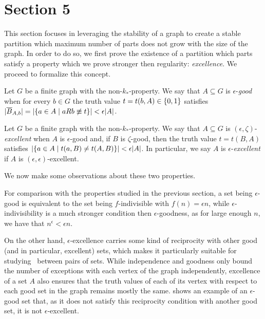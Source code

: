 \section{Section 5} \label{sec:section_5}

    This section focuses in leveraging the stability of a graph to create a stable partition which maximum number
    of parts does not grow with the size of the graph.
    In order to do so, we first prove the existence of a partition which parts satisfy a property which we prove stronger
    then regularity: \emph{excellence}.
    We proceed to formalize this concept.

    \begin{definition}[Definition 5.2(a)]
        Let $G$ be a finite graph with the non-$k_*$-property.
        We say that $A \subseteq G$ is $\epsilon$-\emph{good} when for every $b \in G$ the truth value
        $t = t(b, A) \in \{ 0, 1 \}$ satisfies
        $| \overline{B}_{A,b} | = | \{ a\in A \mid aRb \not\equiv t \} | < \epsilon |A|$.
    \end{definition}

    \begin{definition}[Definition 5.2(b)]
        Let $G$ be a finite graph with the non-$k_*$-property.
        We say that $A \subseteq G$ is $(\epsilon, \zeta)$-\emph{excellent} when $A$ is $\epsilon$-good and, if $B$ is
        $\zeta$-good, then the truth value $t = t(B,A)$ satisfies $| \{ a \in A \mid t(a,B) \neq t(A,B) \} | < \epsilon |A|$.
        In particular, we say $A$ is $\epsilon$-\emph{excellent} if $A$ is $(\epsilon, \epsilon)$-excellent.
    \end{definition}

    We now make some observations about these two properties.

    \begin{remark}
        For comparison with the properties studied in the previous section, a set being $\epsilon$-good is equivalent to the
        set being $f$-indivisible with $f(n) = \epsilon n$, while $\epsilon$-indivisibility is a much stronger condition then
        $\epsilon$-goodness, as for large enough $n$, we have that $n^\epsilon < \epsilon n$.

        On the other hand, $\epsilon$-excellence carries some kind of reciprocity with other good (and in particular,
        excellent) sets, which makes it particularly suitable for studying \regularity~between pairs of sets.
        While independence and goodness only bound the number of exceptions with each vertex of the graph independently,
        excellence of a set $A$ also ensures that the truth values of each of its vertex with respect to each
        good set in the graph remains mostly the same.
         shows an example of an $\epsilon$-good set that, as it does not satisfy this
        reciprocity condition with another good set, it is not $\epsilon$-excellent.
    \end{remark}

